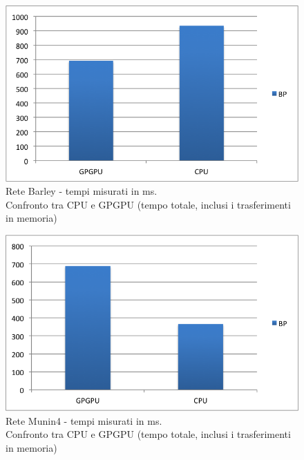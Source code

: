 \documentclass[a4paper]{article}   %
\begin{document}
\begin{figure}[p]
\centering
\includegraphics[scale=0.8]{BarleyTOT.png}
\caption{Rete Barley - tempi misurati in ms.\\Confronto tra CPU e GPGPU (tempo totale, inclusi i trasferimenti in memoria)} 
\label{graficoBarley}
\end{figure}

\begin{figure}[p]
\centering
\includegraphics[scale=0.8]{Munin4TOT.png}
\caption{Rete Munin4 - tempi misurati in ms.\\Confronto tra CPU e GPGPU (tempo totale, inclusi i trasferimenti in memoria)} 
\label{graficoMunin4}
\end{figure}
\end{document}
